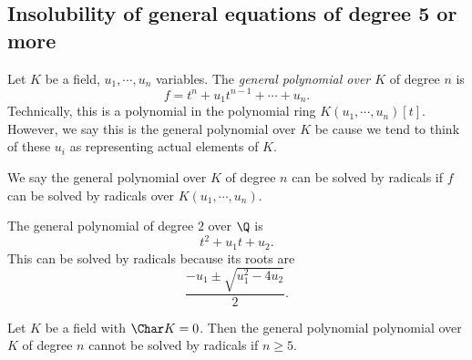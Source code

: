 \documentclass[a4paper]{article}
\begin{document}
\subsection{Insolubility of general equations of degree 5 or more}
\begin{defi}
  Let $K$ be a field, $u_1, \cdots, u_n$ variables. The \emph{general polynomial over $K$} of degree $n$ is
  \[
    f = t^n + u_1t^{n - 1} + \cdots + u_n.
  \]
  Technically, this is a polynomial in the polynomial ring $K(u_1, \cdots, u_n)[t]$. However, we say this is the general polynomial over $K$ be cause we tend to think of these $u_i$ as representing actual elements of $K$.
\end{defi}

We say the general polynomial over $K$ of degree $n$ can be solved by radicals if $f$ can be solved by radicals over $K(u_1, \cdots, u_n)$.

\begin{eg}
  The general polynomial of degree $2$ over $\Q$ is
  \[
    t^2 + u_1 t + u_2.
  \]
  This can be solved by radicals because its roots are
  \[
    \frac{-u_1 \pm \sqrt{u_1^2 - 4u_2}}{2}.
  \]
\end{eg}

\begin{thm}
  Let $K$ be a field with $\Char K = 0$. Then the general polynomial polynomial over $K$ of degree $n$ cannot be solved by radicals if $n \geq 5$.
\end{thm}
\end{document}
